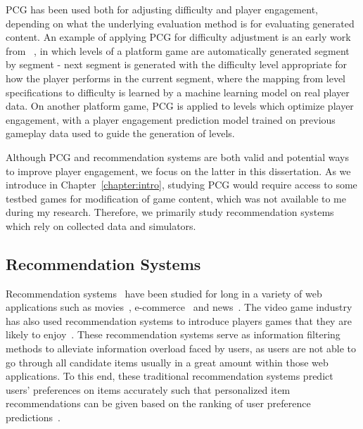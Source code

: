 PCG has been used both for adjusting difficulty and player engagement, depending on what the underlying evaluation method is for evaluating generated content. An example of applying PCG for difficulty adjustment is an early work from ~\cite{jennings2010polymorph}, in which levels of a platform game are automatically generated  segment by segment - next segment is generated with the difficulty level appropriate for how the player performs in the current segment, where the mapping from level specifications to difficulty is learned by a machine learning model on real player data. On another platform game, PCG is applied to levels which optimize player engagement, with a player engagement prediction model trained on previous gameplay data used to guide the generation of levels.  

Although PCG and recommendation systems are both valid and potential ways to improve player engagement, we focus on the latter in this dissertation. As we introduce in Chapter~\ref{chapter:intro}, studying PCG would require access to some testbed games for modification of game content, which was not available to me during my research. Therefore, we primarily study recommendation systems which rely on collected data and simulators.

\subsection{Recommendation Systems}


Recommendation systems~\cite{isinkaye2015recommendation,bobadilla2013recommender,resnick1997recommender,adomavicius2005toward} have been studied for long in a variety of web applications such as movies~\cite{amatriain2012netflix}, e-commerce~\cite{linden2003amazon} and news~\cite{das2007google}. The video game industry has also used recommendation systems to introduce players games that they are likely to enjoy~\cite{sifa2014archetypal,orland10,skocir2012mars,wu2017recommendation}. These recommendation systems serve as information filtering methods to alleviate information overload faced by users, as users are not able to go through all candidate items usually in a great amount within those web applications. To this end, these traditional recommendation systems predict users' preferences on items accurately such that personalized item recommendations can be given based on the ranking of user preference predictions~\cite{liang2006personalized}. 

